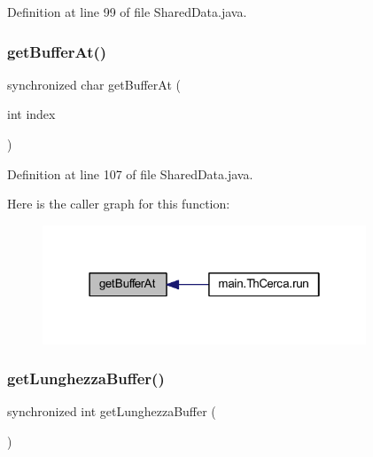 Definition at line 99 of file Shared\+Data.\+java.

\mbox{\label{classmain_1_1_shared_data_acdbb1bf0749f6d59ec74661b16cb10f7}} 
\subsubsection{\texorpdfstring{get\+Buffer\+At()}{getBufferAt()}}
{\footnotesize\ttfamily synchronized char get\+Buffer\+At (\begin{DoxyParamCaption}\item[{int}]{index }\end{DoxyParamCaption})}



Definition at line 107 of file Shared\+Data.\+java.

Here is the caller graph for this function\+:
\nopagebreak
\begin{figure}[H]
\begin{center}
\leavevmode
\includegraphics[width=274pt]{classmain_1_1_shared_data_acdbb1bf0749f6d59ec74661b16cb10f7_icgraph}
\end{center}
\end{figure}
\mbox{\label{classmain_1_1_shared_data_a2f606346e7f2ae2e2da2ad211c0bf08a}} 
\subsubsection{\texorpdfstring{get\+Lunghezza\+Buffer()}{getLunghezzaBuffer()}}
{\footnotesize\ttfamily synchronized int get\+Lunghezza\+Buffer (\begin{DoxyParamCaption}{ }\end{DoxyParamCaption})}



